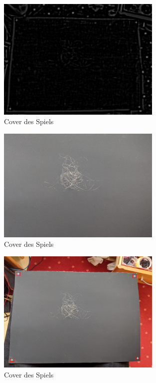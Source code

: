 \documentclass[german,a4paper, 12pt]{scrartcl}
\begin{document}
\begin{figure}
	\centering
	\includegraphics[width=0.7\textwidth]{figBina/02revRes.png}
	\caption[]{Cover des Spiels}
	\label{img:Bina01}
\end{figure}
\begin{figure}
	\centering
	\includegraphics[width=0.7\textwidth]{figBina/03crop image.png}
	\caption[]{Cover des Spiels}
	\label{img:Bina01}
\end{figure}
\begin{figure}
	\centering
	\includegraphics[width=0.7\textwidth]{figBina/03rectImg.png}
	\caption[]{Cover des Spiels}
	\label{img:Bina01}
\end{figure}
\end{document}
